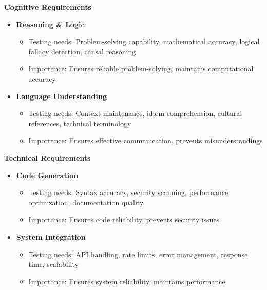 \textbf{Cognitive Requirements~}
\begin{itemize}
    \item \textbf{Reasoning \& Logic}
    \begin{itemize}
        \item Testing needs: Problem-solving capability, mathematical accuracy, logical fallacy detection, causal reasoning
        \item Importance: Ensures reliable problem-solving, maintains computational accuracy
    \end{itemize}
    
    \item \textbf{Language Understanding}
    \begin{itemize}
        \item Testing needs: Context maintenance, idiom comprehension, cultural references, technical terminology
        \item Importance: Ensures effective communication, prevents misunderstandings
    \end{itemize}
\end{itemize}

\textbf{Technical Requirements}
\begin{itemize}
    \item \textbf{Code Generation}
    \begin{itemize}
        \item Testing needs: Syntax accuracy, security scanning, performance optimization, documentation quality
        \item Importance: Ensures code reliability, prevents security issues
    \end{itemize}
    
    \item \textbf{System Integration}
    \begin{itemize}
        \item Testing needs: API handling, rate limits, error management, response time, scalability
        \item Importance: Ensures system reliability, maintains performance
    \end{itemize}
\end{itemize}

